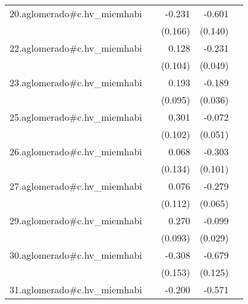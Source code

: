 {\begin{longtable}{l*{4}{D{.}{.}{-1}}}
\addlinespace
20.aglomerado#c.hv\_miemhabi&                     &      -0.231         &      -0.601\sym{***}&                     \\
            &                     &     (0.166)         &     (0.140)         &                     \\
\addlinespace
22.aglomerado#c.hv\_miemhabi&                     &       0.128         &      -0.231\sym{***}&                     \\
            &                     &     (0.104)         &     (0.049)         &                     \\
\addlinespace
23.aglomerado#c.hv\_miemhabi&                     &       0.193\sym{*}  &      -0.189\sym{***}&                     \\
            &                     &     (0.095)         &     (0.036)         &                     \\
\addlinespace
25.aglomerado#c.hv\_miemhabi&                     &       0.301\sym{**} &      -0.072         &                     \\
            &                     &     (0.102)         &     (0.051)         &                     \\
\addlinespace
26.aglomerado#c.hv\_miemhabi&                     &       0.068         &      -0.303\sym{**} &                     \\
            &                     &     (0.134)         &     (0.101)         &                     \\
\addlinespace
27.aglomerado#c.hv\_miemhabi&                     &       0.076         &      -0.279\sym{***}&                     \\
            &                     &     (0.112)         &     (0.065)         &                     \\
\addlinespace
29.aglomerado#c.hv\_miemhabi&                     &       0.270\sym{**} &      -0.099\sym{***}&                     \\
            &                     &     (0.093)         &     (0.029)         &                     \\
\addlinespace
30.aglomerado#c.hv\_miemhabi&                     &      -0.308\sym{*}  &      -0.679\sym{***}&                     \\
            &                     &     (0.153)         &     (0.125)         &                     \\
\addlinespace
31.aglomerado#c.hv\_miemhabi&                     &      -0.200         &      -0.571\sym{***}&                     \\

\end{longtable}}
